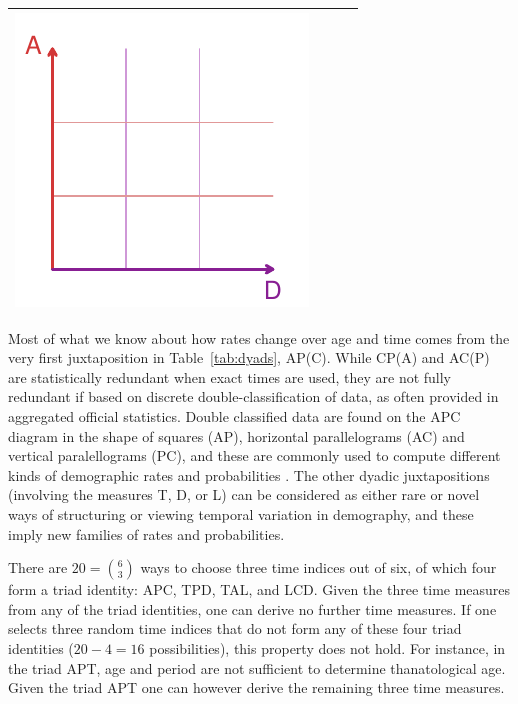 \documentclass[12pt,oneside,a4paper]{article} %
\begin{document}
\begin{longtable}{m{}m{}m{}m{}}
  \includegraphics[scale=.5]{Figures/DiagramTable/AD_rt.pdf}  \\
  \bottomrule
\end{longtable}

Most of what we know about how rates change over age and time comes
from the very first juxtaposition in Table~\ref{tab:dyads}, AP(C). While
CP(A) and AC(P) are statistically redundant when exact times are used, they
are not fully redundant if based on discrete double-classification of data, as
often provided in aggregated official statistics. Double classified data are
found on the APC diagram in the shape of squares (AP), horizontal parallelograms
(AC) and vertical paralellograms (PC), and
these are commonly used to compute different kinds of demographic
rates and probabilities \citep[p63][]{caselli2005demography}. The other dyadic
juxtapositions (involving the measures T, D, or L) can be considered as either
rare or novel ways of structuring or viewing temporal variation in demography,
and these imply new families of rates and probabilities.

There are $20=\binom{6}{3}$ ways to choose three time indices out of
six, of which four form a triad identity: APC, TPD, TAL, and LCD.
Given the three time measures from any of the
triad identities, one can derive no further time measures. If one selects three
random time indices that do not form any of these four triad identities
($20-4=16$ possibilities), this property does not hold. For instance, in the
triad APT, age and period are not sufficient to determine thanatological age.
Given the triad APT one can however derive the remaining three time
measures.%
\end{document}
